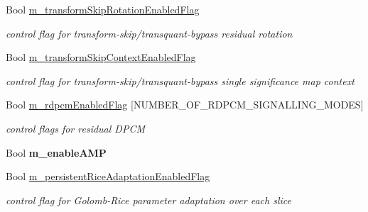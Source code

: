 \begin{DoxyCompactItemize}
\mbox{\label{class_t_app_enc_cfg_a32b507941597c17c968c53757539ca8c}} 
Bool \hyperlink{class_t_app_enc_cfg_a32b507941597c17c968c53757539ca8c}{m\+\_\+transform\+Skip\+Rotation\+Enabled\+Flag}
\begin{DoxyCompactList}\small\item\em control flag for transform-\/skip/transquant-\/bypass residual rotation \end{DoxyCompactList}\item 
\mbox{\label{class_t_app_enc_cfg_a9329541c767ef48099077553369961a2}} 
Bool \hyperlink{class_t_app_enc_cfg_a9329541c767ef48099077553369961a2}{m\+\_\+transform\+Skip\+Context\+Enabled\+Flag}
\begin{DoxyCompactList}\small\item\em control flag for transform-\/skip/transquant-\/bypass single significance map context \end{DoxyCompactList}\item 
\mbox{\label{class_t_app_enc_cfg_ad5f0434195d9feabf365c1774fd4aa78}} 
Bool \hyperlink{class_t_app_enc_cfg_ad5f0434195d9feabf365c1774fd4aa78}{m\+\_\+rdpcm\+Enabled\+Flag} \mbox{[}N\+U\+M\+B\+E\+R\+\_\+\+O\+F\+\_\+\+R\+D\+P\+C\+M\+\_\+\+S\+I\+G\+N\+A\+L\+L\+I\+N\+G\+\_\+\+M\+O\+D\+ES\mbox{]}
\begin{DoxyCompactList}\small\item\em control flags for residual D\+P\+CM \end{DoxyCompactList}\item 
\mbox{\label{class_t_app_enc_cfg_aaf27d91a7d043325ccf35b5676f10945}} 
Bool {\bfseries m\+\_\+enable\+A\+MP}
\item 
\mbox{\label{class_t_app_enc_cfg_a13dc010fa36f7e87eba7de0b0f0a1d4d}} 
Bool \hyperlink{class_t_app_enc_cfg_a13dc010fa36f7e87eba7de0b0f0a1d4d}{m\+\_\+persistent\+Rice\+Adaptation\+Enabled\+Flag}
\begin{DoxyCompactList}\small\item\em control flag for Golomb-\/\+Rice parameter adaptation over each slice \end{DoxyCompactList}\item 
\mbox{\label{class_t_app_enc_cfg_a21ff392609c6dac3d08ec919e76245b9}} 

\end{DoxyCompactItemize}
